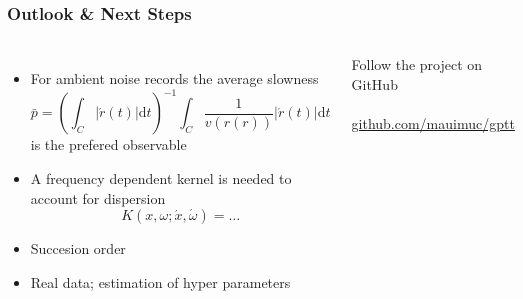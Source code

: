 \documentclass[aspectratio=169, t, 10pt]{beamer}
\begin{document}
\begin{frame}[c]
    \frametitle{Outlook \& Next Steps }

\begin{columns}
%
    \begin{itemize}
        \item For ambient noise records the average slowness
            \begin{equation}
                \bar p = \left(\int_C |\acute r(t)| \mathrm d t \right)^{-1} \int_C \frac 1 {v(r(r))} |\acute r(t)| \mathrm d t
            \end{equation}
            is the prefered observable

        \item A frequency dependent kernel is needed to account for dispersion
            \begin{equation}
                K(x,\omega; \acute x, \acute\omega) = \dots
            \end{equation}

        \item Succesion order
        \item Real data;
            estimation of hyper parameters
    \end{itemize}

\vspace{-6mm}
    \begin{center}
        Follow the project on GitHub
        \\[6mm]
        \\[6mm]
        \small
        \href{https://github.com/mauimuc/gptt}{github.com/mauimuc/gptt}
    \end{center}
\end{columns}

\end{frame}
\end{document}
